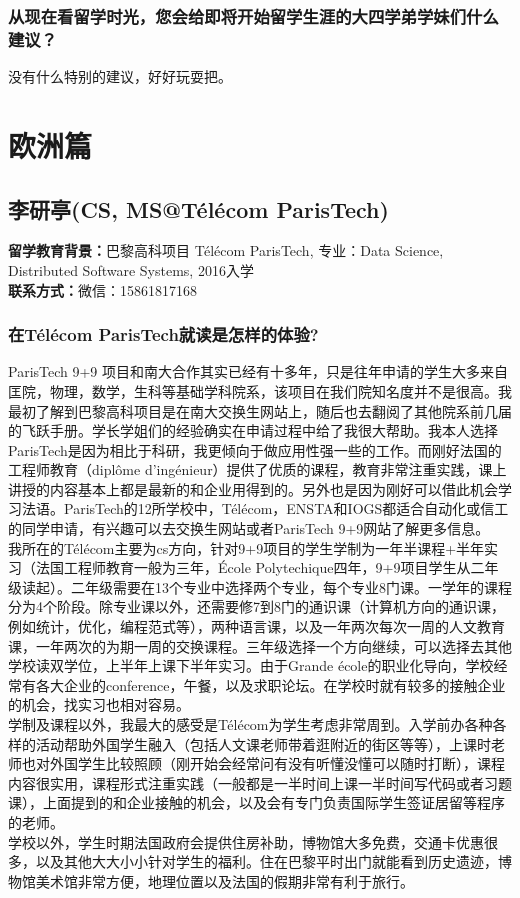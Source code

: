 \documentclass[a4paper,UTF8]{book}
\begin{document}
    \subsubsection*{从现在看留学时光，您会给即将开始留学生涯的大四学弟学妹们什么建议？}
    没有什么特别的建议，好好玩耍把。



\clearpage
\section{欧洲篇}

\subsection{李研亭(CS, MS@Télécom ParisTech)}
    \textbf{留学教育背景：}巴黎高科项目 Télécom ParisTech, 
    专业：Data Science, Distributed Software Systems, 
    2016入学\\
    \textbf{联系方式：}微信：15861817168

    \subsubsection*{在Télécom ParisTech就读是怎样的体验?}
    ParisTech 9+9 项目和南大合作其实已经有十多年，只是往年申请的学生大多来自匡院，物理，数学，生科等基础学科院系，该项目在我们院知名度并不是很高。我最初了解到巴黎高科项目是在南大交换生网站上，随后也去翻阅了其他院系前几届的飞跃手册。学长学姐们的经验确实在申请过程中给了我很大帮助。我本人选择ParisTech是因为相比于科研，我更倾向于做应用性强一些的工作。而刚好法国的工程师教育（diplôme d’ingénieur）提供了优质的课程，教育非常注重实践，课上讲授的内容基本上都是最新的和企业用得到的。另外也是因为刚好可以借此机会学习法语。ParisTech的12所学校中，Télécom，ENSTA和IOGS都适合自动化或信工的同学申请，有兴趣可以去交换生网站或者ParisTech 9+9网站了解更多信息。\\
    我所在的Télécom主要为cs方向，针对9+9项目的学生学制为一年半课程+半年实习（法国工程师教育一般为三年，École Polytechique四年，9+9项目学生从二年级读起）。二年级需要在13个专业中选择两个专业，每个专业8门课。一学年的课程分为4个阶段。除专业课以外，还需要修7到8门的通识课（计算机方向的通识课，例如统计，优化，编程范式等），两种语言课，以及一年两次每次一周的人文教育课，一年两次的为期一周的交换课程。三年级选择一个方向继续，可以选择去其他学校读双学位，上半年上课下半年实习。由于Grande école的职业化导向，学校经常有各大企业的conference，午餐，以及求职论坛。在学校时就有较多的接触企业的机会，找实习也相对容易。\\
    学制及课程以外，我最大的感受是Télécom为学生考虑非常周到。入学前办各种各样的活动帮助外国学生融入（包括人文课老师带着逛附近的街区等等），上课时老师也对外国学生比较照顾（刚开始会经常问有没有听懂没懂可以随时打断），课程内容很实用，课程形式注重实践（一般都是一半时间上课一半时间写代码或者习题课），上面提到的和企业接触的机会，以及会有专门负责国际学生签证居留等程序的老师。\\
    学校以外，学生时期法国政府会提供住房补助，博物馆大多免费，交通卡优惠很多，以及其他大大小小针对学生的福利。住在巴黎平时出门就能看到历史遗迹，博物馆美术馆非常方便，地理位置以及法国的假期非常有利于旅行。
    
\end{document}
